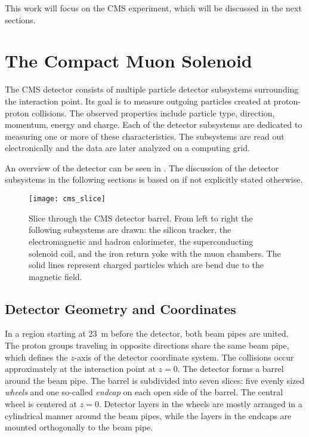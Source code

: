 This work will focus on the \ac{CMS} experiment, which will be discussed in the next sections.

\section{The Compact Muon Solenoid}
The \ac{CMS} detector consists of multiple particle detector subsystems surrounding the interaction point.
Its goal is to measure outgoing particles created at proton-proton collisions.
The observed properties include particle type, direction, momentum, energy and charge. Each of the detector subsystems are dedicated to measuring one or more of these characteristics. The subsystems are read out electronically and the data are later analyzed on a computing grid.

An overview of the detector can be seen in . The discussion of the detector subsystems in the following sections is based on \cite{Chatrchyan:CMSexperimentCERN} if not explicitly stated otherwise.

\begin{figure}
    \centering
    \hspace{0.02\textwidth}
    \texttt{[image: cms\_slice]}
    \caption{Slice through the CMS detector barrel. From left to right the following subsystems are drawn: the silicon tracker, the electromagnetic and hadron calorimeter, the superconducting solenoid coil, and the iron return yoke with the muon chambers. The solid lines represent charged particles which are bend due to the magnetic field\cite[modified]{Davis:CMSSlice}.}
    \label{fig:CMS_slice}
\end{figure}

\subsection{Detector Geometry and Coordinates}
In a region starting at \SI{23}{\m} before the detector, both beam pipes are united\cite{Evans:LHCMachine}. The proton groups traveling in opposite directions share the same beam pipe, which defines the $z$-axis of the detector coordinate system. The collisions occur approximately at the interaction point at $z = 0$.
The detector forms a barrel around the beam pipe. The barrel is subdivided into seven slices: five evenly sized \emph{wheels} and one so-called \emph{endcap} on each open side of the barrel. The central wheel is centered at $z = 0$.
Detector layers in the wheels are mostly arranged in a cylindrical manner around the beam pipes, while the layers in the endcaps are mounted orthogonally to the beam pipe.

